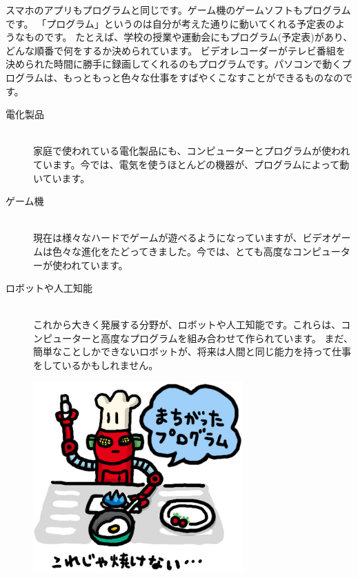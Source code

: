 スマホのアプリもプログラムと同じです。ゲーム機のゲームソフトもプログラムです。
「プログラム」というのは自分が考えた通りに動いてくれる予定表のようなものです。
たとえば、学校の授業や運動会にもプログラム(予定表)があり、どんな順番で何をするか決められています。
ビデオレコーダーがテレビ番組を決められた時間に勝手に録画してくれるのもプログラムです。パソコンで動くプログラムは、もっともっと色々な仕事をすばやくこなすことができるものなのです。

\begin{description}
  \item[電化製品]\mbox{}\\
  家庭で使われている電化製品にも、コンピューターとプログラムが使われています。今では、電気を使うほとんどの機器が、プログラムによって動いています。
  \item[ゲーム機]\mbox{}\\
  現在は様々なハードでゲームが遊べるようになっていますが、ビデオゲームは色々な進化をたどってきました。今では、とても高度なコンピューターが使われています。
  \item[ロボットや人工知能]\mbox{}\\
  これから大きく発展する分野が、ロボットや人工知能です。これらは、コンピューターと高度なプログラムを組み合わせて作られています。
  まだ、簡単なことしかできないロボットが、将来は人間と同じ能力を持って仕事をしているかもしれません。
\end{description}

\begin{figure}[H]
  \begin{center}
    \includegraphics[width=8.031cm,height=7.304cm]{images/chap02/text02-img006.jpg}
  \end{center}
  \label{fig:robot}
\end{figure}
\clearpage

